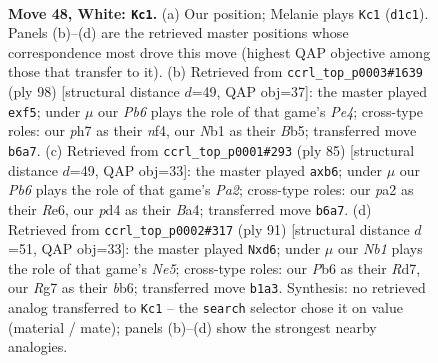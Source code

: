 \documentclass[11pt]{article}
\begin{document}
\clearpage

\begin{figure}[p]\centering
\begin{subfigure}{0.46\textwidth}\centering
\resizebox{\linewidth}{!}{%
\newchessgame
\chessboard[
  setfen={2bk1r2/p5Rp/1P6/4nP2/1p1p4/8/p3P3/1N1K4 w - - 2 48},
  showmover=false,
  pgfstyle=straightmove, color=movearrow, markmove={d1-c1}
]}
\caption{}
\end{subfigure}\hfill
\begin{subfigure}{0.46\textwidth}\centering
\resizebox{\linewidth}{!}{%
\newchessgame
\chessboard[
  setfen={8/1r4kp/8/1B2ppp1/2P1PnP1/K7/1P6/5R2 w - - 0 50},
  showmover=false,
  pgfstyle=straightmove, color=movearrow, markmove={e4-f5}
]}
\caption{}
\end{subfigure}
\\[4pt]
\begin{subfigure}{0.46\textwidth}\centering
\resizebox{\linewidth}{!}{%
\newchessgame
\chessboard[
  setfen={8/p5k1/1P2r3/4N3/b2P3P/4P3/1np1B1P1/2R3K1 b - - 0 43},
  showmover=false,
  pgfstyle=straightmove, color=movearrow, markmove={a7-b6}
]}
\caption{}
\end{subfigure}\hfill
\begin{subfigure}{0.46\textwidth}\centering
\resizebox{\linewidth}{!}{%
\newchessgame
\chessboard[
  setfen={8/3r1k2/1BpP3p/p2pR3/P3n1P1/2P5/1P4K1/8 b - - 0 46},
  showmover=false,
  pgfstyle=straightmove, color=movearrow, markmove={e4-d6}
]}
\caption{}
\end{subfigure}
\caption{\textbf{Move 48, White: \texttt{Kc1}.} (a) Our position; Melanie plays \texttt{Kc1} (\texttt{d1c1}). Panels (b)--(d) are the retrieved master positions whose correspondence most drove this move (highest QAP objective among those that transfer to it). (b) Retrieved from \texttt{ccrl\_top\_p0003\#1639} (ply 98) [structural distance $d$=49, QAP obj=37]: the master played \texttt{exf5}; under $\mu$ our \emph{Pb6} plays the role of that game's \emph{Pe4}; cross-type roles: our \emph{p}h7 as their \emph{n}f4, our \emph{N}b1 as their \emph{B}b5; transferred move \texttt{b6a7}. (c) Retrieved from \texttt{ccrl\_top\_p0001\#293} (ply 85) [structural distance $d$=49, QAP obj=33]: the master played \texttt{axb6}; under $\mu$ our \emph{Pb6} plays the role of that game's \emph{Pa2}; cross-type roles: our \emph{p}a2 as their \emph{R}e6, our \emph{p}d4 as their \emph{B}a4; transferred move \texttt{b6a7}. (d) Retrieved from \texttt{ccrl\_top\_p0002\#317} (ply 91) [structural distance $d$=51, QAP obj=33]: the master played \texttt{Nxd6}; under $\mu$ our \emph{Nb1} plays the role of that game's \emph{Ne5}; cross-type roles: our \emph{P}b6 as their \emph{R}d7, our \emph{R}g7 as their \emph{b}b6; transferred move \texttt{b1a3}. Synthesis: no retrieved analog transferred to \texttt{Kc1} -- the \texttt{search} selector chose it on value (material / mate); panels (b)--(d) show the strongest nearby analogies.}
\label{fig:thought-m94}
\end{figure}
\end{document}
